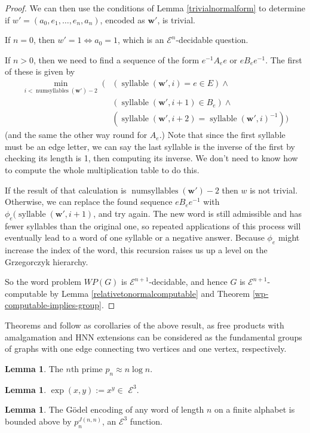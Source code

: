 \documentclass[a4paper]{article}
\newcommand{\grz}[1]{$\mathcal{E}^{#1}$}	%
\newcommand{\wvec}{\mathbf{w}}	%
\theoremstyle{plain}
\theoremstyle{definition}
\newtheorem{lemma}[theorem]{Lemma}
\begin{document}
\begin{proof}
We can then use the conditions of Lemma \ref{trivialnormalform} to determine if $w' = (a_0,e_1, \dots, e_n, a_n)$, encoded as $\wvec'$, is trivial.

If $n=0$, then $w'=1 \Leftrightarrow a_0=1$, which is an \grz{n}-decidable question.

If $n>0$, then we need to find a sequence of the form $e^{-1}A_ee$ or $eB_ee^{-1}$. The first of these is given by
\begin{equation}
\begin{split}
	\min_{i < \operatorname{numsyllables}(\wvec')-2} \; (&  (\operatorname{syllable}(\wvec',i) = e \in E) \wedge \\ 
	& ( \operatorname{syllable}(\wvec',i+1) \in B_e ) \wedge \\ 
	& ( \operatorname{syllable}(\wvec',i+2) = \operatorname{syllable}(\wvec',i)^{-1} ) )
\end{split} 
\end{equation}
(and the same the other way round for $A_e$.) Note that since the first syllable must be an edge letter, we can say the last syllable is the inverse of the first by checking its length is 1, then computing its inverse. We don't need to know how to compute the whole multiplication table to do this.

If the result of that calculation is $\operatorname{numsyllables}(\wvec')-2$ then $w$ is not trivial. Otherwise, we can replace the found sequence $eB_ee^{-1}$ with $\phi_e(\operatorname{syllable}(\wvec',i+1)$, and try again. The new word is still admissible and has fewer syllables than the original one, so repeated applications of this process will eventually lead to a word of one syllable or a negative answer. Because $\phi_e$ might increase the index of the word, this recursion raises us up a level on the Grzegorczyk hierarchy.

So the word problem $WP(G)$ is \grz{n+1}-decidable, and hence $G$ is \grz{n+1}-computable by Lemma \ref{relativetonormalcomputable} and Theorem \ref{wp-computable-implies-group}.
\end{proof}

Theorems \cite[4.6]{Cannonito_1973} and \cite[5.3]{Cannonito_1973} follow as corollaries of the above result, as free products with amalgamation and HNN extensions can be considered as the fundamental groups of graphs with one edge connecting two vertices and one vertex, respectively.

\begin{lemma}\label{primedist}
The $n$th prime $p_n \approx n \log n$.
\end{lemma}
\begin{lemma}\label{expine3}
$\exp(x,y) := x^y \in $ \grz{3}.
\end{lemma}
\begin{lemma}\label{godelbound}
The G\"odel encoding of any word of length $n$ on a finite alphabet is bounded above by $p_n^{J(n,n)}$, an \grz{3} function.
\end{lemma}
\end{document}
